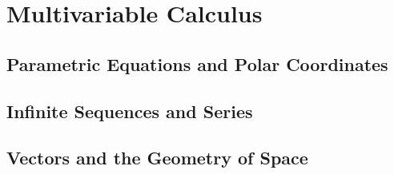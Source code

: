 \tableofcontents
\newpage

\pagestyle{plain}

\part{Multivariable Calculus}
  \chapter{Parametric Equations and Polar Coordinates}
    \graphicspath{{"Chapter 11/Section 11.1/images/"}}
    
    
    \graphicspath{{"Chapter 11/Section 11.3/images/"}}
    
    
    \graphicspath{{"Chapter 11/Section 11.5/images/"}}
    
    \graphicspath{{"Chapter 11/Section 11.6/images/"}}
    

  \chapter{Infinite Sequences and Series}
    \graphicspath{{"Chapter 12/Section 12.1/images/"}}
    
    
    \graphicspath{{"Chapter 12/Section 12.3/images/"}}
    
    
    
    
    
    \graphicspath{{"Chapter 12/Section 12.8/images/"}}
    
    
    
    
    

  \chapter{Vectors and the Geometry of Space}
    \graphicspath{{"Chapter 13/Section 13.1/images/"}}
    
    \graphicspath{{"Chapter 13/Section 13.2/images/"}}
    
    
    
    
    
    


